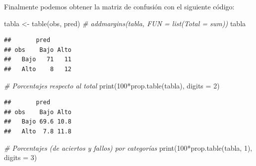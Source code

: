 \documentclass[
]{book}
\newenvironment{Shaded}{\begin{snugshade}}{\end{snugshade}}
\newcommand{\AttributeTok}[1]{\textcolor[rgb]{0.77,0.63,0.00}{#1}}
\newcommand{\CommentTok}[1]{\textcolor[rgb]{0.56,0.35,0.01}{\textit{#1}}}
\newcommand{\DecValTok}[1]{\textcolor[rgb]{0.00,0.00,0.81}{#1}}
\newcommand{\FloatTok}[1]{\textcolor[rgb]{0.00,0.00,0.81}{#1}}
\newcommand{\FunctionTok}[1]{\textcolor[rgb]{0.00,0.00,0.00}{#1}}
\newcommand{\NormalTok}[1]{#1}
\newcommand{\OtherTok}[1]{\textcolor[rgb]{0.56,0.35,0.01}{#1}}
\newcommand{\SpecialCharTok}[1]{\textcolor[rgb]{0.00,0.00,0.00}{#1}}
\newcommand{\StringTok}[1]{\textcolor[rgb]{0.31,0.60,0.02}{#1}}
\theoremstyle{break}
\theoremstyle{definition}
\theoremstyle{definition}
\theoremstyle{definition}
\theoremstyle{definition}
\theoremstyle{remark}
\begin{document}
\begin{Shaded}
\end{Shaded}

Finalmente podemos obtener la matriz de confusión con el siguiente código:

\begin{Shaded}
\begin{Highlighting}[]
\NormalTok{tabla }\OtherTok{\textless{}{-}} \FunctionTok{table}\NormalTok{(obs, pred)}
\CommentTok{\# addmargins(tabla, FUN = list(Total = sum))}
\NormalTok{tabla}
\end{Highlighting}
\end{Shaded}

\begin{verbatim}
##       pred
## obs    Bajo Alto
##   Bajo   71   11
##   Alto    8   12
\end{verbatim}

\begin{Shaded}
\begin{Highlighting}[]
\CommentTok{\# Porcentajes respecto al total}
\FunctionTok{print}\NormalTok{(}\DecValTok{100}\SpecialCharTok{*}\FunctionTok{prop.table}\NormalTok{(tabla), }\AttributeTok{digits =} \DecValTok{2}\NormalTok{) }
\end{Highlighting}
\end{Shaded}

\begin{verbatim}
##       pred
## obs    Bajo Alto
##   Bajo 69.6 10.8
##   Alto  7.8 11.8
\end{verbatim}

\begin{Shaded}
\begin{Highlighting}[]
\CommentTok{\# Porcentajes (de aciertos y fallos) por categorías}
\FunctionTok{print}\NormalTok{(}\DecValTok{100}\SpecialCharTok{*}\FunctionTok{prop.table}\NormalTok{(tabla, }\DecValTok{1}\NormalTok{), }\AttributeTok{digits =} \DecValTok{3}\NormalTok{) }
\end{Highlighting}
\end{Shaded}
\end{document}

